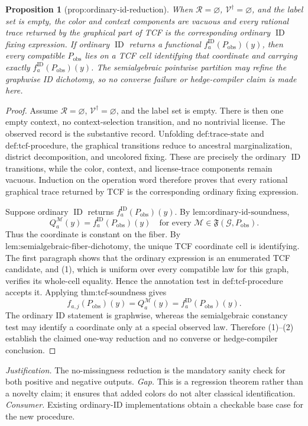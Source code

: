 \documentclass{article}
\newtheorem{proposition}{Proposition}
\begin{document}
\begin{proposition}[prop:ordinary-id-reduction]\label{prop:ordinary-id-reduction}
When \(\mathcal R=\varnothing\), \(\mathcal V^{\dagger}=\varnothing\), and the label set is empty, the color and context components are vacuous and every rational trace returned by the graphical part of TCF is the corresponding ordinary \(\operatorname{ID}\) fixing expression. If ordinary \(\operatorname{ID}\) returns a functional \(f_a^{\mathrm{ID}}(P_{\mathrm{obs}})(y)\), then every compatible \(P_{\mathrm{obs}}\) lies on a TCF cell identifying that coordinate and carrying exactly \(f_a^{\mathrm{ID}}(P_{\mathrm{obs}})(y)\). The semialgebraic pointwise partition may refine the graphwise ID dichotomy, so no converse failure or hedge-compiler claim is made here.
\end{proposition}
\begin{proof}
Assume \(\mathcal R=\varnothing\), \(\mathcal V^{\dagger}=\varnothing\), and the label set is empty.  There is then one empty context, no context-selection transition, and no nontrivial license.  The observed record is the substantive record.  Unfolding \(\text{def:trace-state}\) and \(\text{def:tcf-procedure}\), the graphical transitions reduce to ancestral marginalization, district decomposition, and uncolored fixing.  These are precisely the ordinary \(\operatorname{ID}\) transitions, while the color, context, and license-trace components remain vacuous.  Induction on the operation word therefore proves that every rational graphical trace returned by TCF is the corresponding ordinary fixing expression.

Suppose ordinary \(\operatorname{ID}\) returns \(f_a^{\mathrm{ID}}(P_{\mathrm{obs}})(y)\).  By \(\text{lem:ordinary-id-soundness}\),
\[
Q_a^{\mathcal M}(y)
=f_a^{\mathrm{ID}}(P_{\mathrm{obs}})(y)
\quad\text{for every }\mathcal M\in\mathfrak F(\mathcal G,P_{\mathrm{obs}}).
\tag{1}
\]
Thus the coordinate is constant on the fiber.  By \(\text{lem:semialgebraic-fiber-dichotomy}\), the unique TCF coordinate cell is identifying.  The first paragraph shows that the ordinary expression is an enumerated TCF candidate, and (1), which is uniform over every compatible law for this graph, verifies its whole-cell equality.  Hence the annotation test in \(\text{def:tcf-procedure}\) accepts it.  Applying \(\text{thm:tcf-soundness}\) gives
\[
f_{a,j}(P_{\mathrm{obs}})(y)
=Q_a^{\mathcal M}(y)
=f_a^{\mathrm{ID}}(P_{\mathrm{obs}})(y).
\tag{2}
\]
The ordinary ID statement is graphwise, whereas the semialgebraic constancy test may identify a coordinate only at a special observed law.  Therefore (1)--(2) establish the claimed one-way reduction and no converse or hedge-compiler conclusion.
\end{proof}
\par\smallskip\noindent \textit{Justification.} The no-missingness reduction is the mandatory sanity check for both positive and negative outputs. \textit{Gap.} This is a regression theorem rather than a novelty claim; it ensures that added colors do not alter classical identification. \textit{Consumer.} Existing ordinary-ID implementations obtain a checkable base case for the new procedure.
\end{document}
